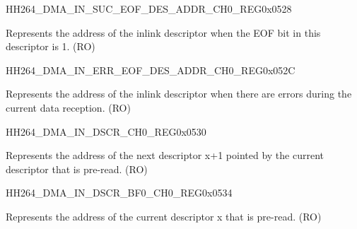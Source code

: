 \begin{register}{H}{H264\_DMA\_IN\_SUC\_EOF\_DES\_ADDR\_CH0\_REG}{0x0528}\label{regdesc:H264DMAINSUCEOFDESADDRCH0REG}
%
\regnewline%
\begin{regdesc}\begin{reglist}
\label{fielddesc:H264DMAINSUCEOFDESADDRCH0}\item [H264\_DMA\_IN\_SUC\_EOF\_DES\_ADDR\_CH0] Represents the address of the inlink descriptor when the EOF bit in this descriptor is 1. (RO)
\end{reglist}\end{regdesc}
\end{register}


\begin{register}{H}{H264\_DMA\_IN\_ERR\_EOF\_DES\_ADDR\_CH0\_REG}{0x052C}\label{regdesc:H264DMAINERREOFDESADDRCH0REG}
%
\regnewline%
\begin{regdesc}\begin{reglist}
\label{fielddesc:H264DMAINERREOFDESADDRCH0}\item [H264\_DMA\_IN\_ERR\_EOF\_DES\_ADDR\_CH0] Represents the address of the inlink descriptor when there are errors during the current data reception. (RO)
\end{reglist}\end{regdesc}
\end{register}


\begin{register}{H}{H264\_DMA\_IN\_DSCR\_CH0\_REG}{0x0530}\label{regdesc:H264DMAINDSCRCH0REG}
%
\regnewline%
\begin{regdesc}\begin{reglist}
\label{fielddesc:H264DMAINLINKDSCRCH0}\item [H264\_DMA\_INLINK\_DSCR\_CH0] Represents the address of the next descriptor x+1 pointed by the current descriptor that is pre-read. (RO)
\end{reglist}\end{regdesc}
\end{register}


\begin{register}{H}{H264\_DMA\_IN\_DSCR\_BF0\_CH0\_REG}{0x0534}\label{regdesc:H264DMAINDSCRBF0CH0REG}
%
\regnewline%
\begin{regdesc}\begin{reglist}
\label{fielddesc:H264DMAINLINKDSCRBF0CH0}\item [H264\_DMA\_INLINK\_DSCR\_BF0\_CH0] Represents the address of the current descriptor x that is pre-read. (RO)
\end{reglist}\end{regdesc}
\end{register}


